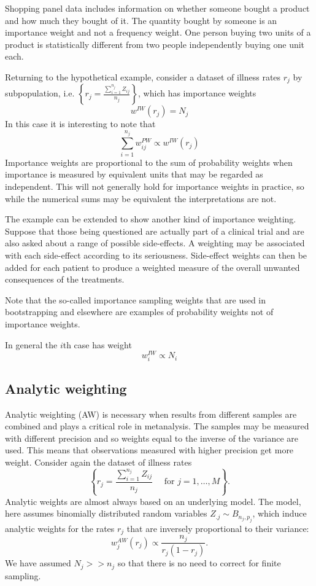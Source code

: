 \documentclass{svmult}
\begin{document}
Shopping panel data includes information on whether someone bought a product and how much they bought of it.  The quantity bought by someone is an importance weight and not a frequency weight.  One person buying two units of a product is statistically different from two people independently buying one unit each.

Returning to the hypothetical example, consider a dataset of illness rates $r_j$ by subpopulation, i.e. $\left\{r_j=\frac{\sum_{i=1}^{n_j}Z_{ij}}{n_j}\right\}$, which has importance weights 
$$w^{IW}(r_j)=N_j$$
In this case it is interesting to note that
$$\sum_{i=1}^{n_j}w_{ij}^{PW} \propto  w^{IW}(r_j)$$
Importance weights are proportional to the sum of probability weights when importance is measured by equivalent units that may be regarded as independent.  This will not generally hold for importance weights in practice, so while the numerical sums may be equivalent the interpretations are not.

The example can be extended to show another kind of importance weighting.  Suppose that those being questioned are actually part of a clinical trial and are also asked about a range of possible side-effects.  A weighting may be associated with each side-effect according to its seriousness.   Side-effect weights can then be added for each patient to produce a weighted measure of the overall unwanted consequences of the treatments.

Note that the so-called importance sampling weights that are used in bootstrapping and elsewhere are examples of probability weights not of importance weights.

In general the $i$th case has weight
$$w_i^{IW}\propto N_i$$

\subsection{Analytic weighting}
\label{aw}
Analytic weighting (AW) is necessary when results from different samples are combined and plays a critical role in metanalysis.  The samples may be measured with different precision and so weights equal to the inverse of the variance are used.  This means that observations measured with higher precision get more weight.
Consider again the dataset of illness rates 
$$\left\{r_j=\frac{\sum_{i=1}^{n_j}Z_{ij}}{n_j}\quad \text{ for }j=1,\dots,M\right\}.$$
\noindent Analytic weights are almost always based on an underlying model. The model, here assumes binomially distributed random variables $Z_{.j} \sim B_{n_j, p_j}$, which induce analytic weights for the rates $r_j$ that are inversely proportional to their variance:
\[
w_j^{AW}(r_j) \propto \frac{n_j}{r_j(1-r_j)}.
\]
We have assumed $N_j>>n_j$ so that there is no need to correct for finite sampling.
 
\end{document}

